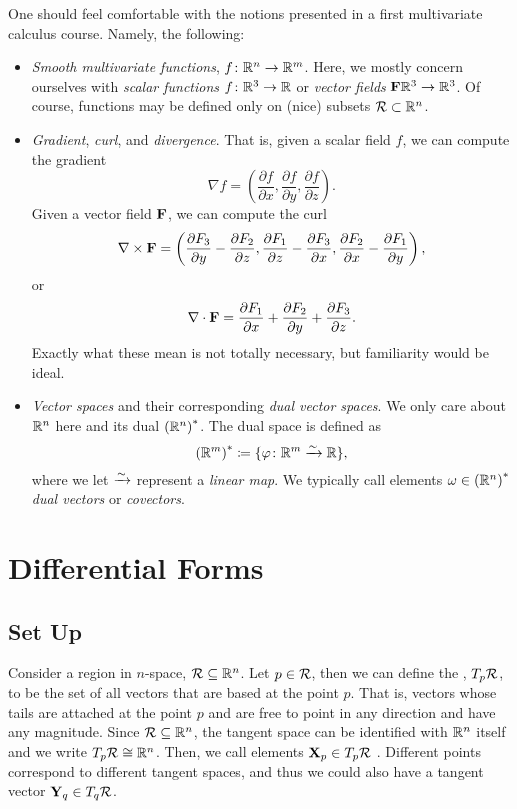 One should feel comfortable with the notions presented in a first multivariate calculus course. Namely, the following:
\begin{itemize}
    \item \emph{Smooth multivariate functions}, $f\colon \mathbb{R}^n \to \mathbb{R}^m$. Here, we mostly concern ourselves with \emph{scalar functions} $f\colon \mathbb{R}^3\to \mathbb{R}$ or \emph{vector fields} $\mathbf{F} \mathbb{R}^3 \to \mathbb{R}^3$. Of course, functions may be defined only on (nice) subsets $\mathcal{R} \subset \mathbb{R}^n$.  
    \item \emph{Gradient}, \emph{curl}, and \emph{divergence}.  That is, given a scalar field $f$, we can compute the gradient
    \[
    \nabla f = \left(\frac{\partial f}{\partial x}, \frac{\partial f}{\partial y}, \frac{\partial f}{\partial z}\right).
    \]
    Given a vector field $\mathbf{F}$, we can compute the curl
    \[
    \nabla \times \mathbf{F} = \left(\frac{\partial F_3}{\partial y}-\frac{\partial F_2}{\partial z}, \frac{\partial F_1}{\partial z}-\frac{\partial F_3}{\partial x}, \frac{\partial F_2}{\partial x}-\frac{\partial F_1}{\partial y}\right),
    \]
    or
    \[
    \nabla \cdot \mathbf{F} = \frac{\partial F_1}{\partial x}+\frac{\partial F_2}{\partial y}+\frac{\partial F_3}{\partial z}.
    \]
    Exactly what these mean is not totally necessary, but familiarity would be ideal.
    \item \emph{Vector spaces} and their corresponding \emph{dual vector spaces}. We only care about $\mathbb{R}^n$ here and its dual $\left(\mathbb{R}^n\right)^*$.  The dual space is defined as
    \[
    \left(\mathbb{R}^m\right)^* \coloneqq \{ \varphi \colon \mathbb{R}^m \xrightarrow{\sim} \mathbb{R}\},
    \]
    where we let $\xrightarrow{\sim}$ represent a \emph{linear map}. We typically call elements $\omega \in \left(\mathbb{R}^n\right)^*$ \emph{dual vectors} or \emph{covectors}.
\end{itemize}

\section{Differential Forms}

\subsection{Set Up}
Consider a region in $n$-space, $\mathcal{R} \subseteq \mathbb{R}^n$. Let $p\in \mathcal{R}$, then we can define the , $T_p\mathcal{R}$, to be the set of all vectors that are based at the point $p$. That is, vectors whose tails are attached at the point $p$ and are free to point in any direction and have any magnitude. Since $\mathcal{R} \subseteq \mathbb{R}^n$, the tangent space can be identified with $\mathbb{R}^n$ itself and we write $T_p\mathcal{R} \cong \mathbb{R}^n$. Then, we call elements $\mathbf{X}_p \in T_p\mathcal{R}$ . Different points correspond to different tangent spaces, and thus we could also have a tangent vector $\mathbf{Y}_q\in T_q\mathcal{R}$.


